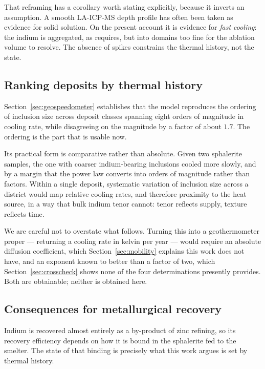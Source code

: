 \documentclass[preprint,12pt,authoryear]{elsarticle}
\begin{document}
That reframing has a corollary worth stating explicitly, because it inverts an
assumption. A smooth LA-ICP-MS depth profile has often been taken as evidence
for solid solution. On the present account it is evidence for \emph{fast
cooling}: the indium is aggregated, as \citet{yu2026b} requires, but into
domains too fine for the ablation volume to resolve. The absence of spikes
constrains the thermal history, not the state.

\subsection{Ranking deposits by thermal history}

Section~\ref{sec:geospeedometer} establishes that the model reproduces the
ordering of inclusion size across deposit classes spanning eight orders of
magnitude in cooling rate, while disagreeing on the magnitude by a factor of
about $1.7$. The ordering is the part that is usable now.

Its practical form is comparative rather than absolute. Given two sphalerite
samples, the one with coarser indium-bearing inclusions cooled more slowly, and
by a margin that the power law converts into orders of magnitude rather than
factors. Within a single deposit, systematic variation of inclusion size across
a district would map relative cooling rates, and therefore proximity to the heat
source, in a way that bulk indium tenor cannot: tenor reflects supply, texture
reflects time.

We are careful not to overstate what follows. Turning this into a
geothermometer proper --- returning a cooling rate in kelvin per year --- would
require an absolute diffusion coefficient, which Section~\ref{sec:mobility}
explains this work does not have, and an exponent known to better than a factor
of two, which Section~\ref{sec:crosscheck} shows none of the four
determinations presently provides. Both are obtainable; neither is obtained
here.

\subsection{Consequences for metallurgical recovery}

Indium is recovered almost entirely as a by-product of zinc refining, so its
recovery efficiency depends on how it is bound in the sphalerite fed to the
smelter. The state of that binding is precisely what this work argues is set by
thermal history.
\end{document}

